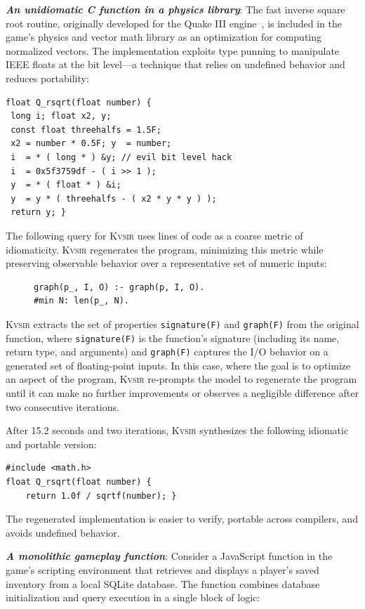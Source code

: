 \documentclass[sigplan,review,anonymous,10pt]{acmart}
\newcommand{\sys}{{\scshape Kv{\textalpha}sir}\xspace}
\newcommand{\heading}[1]{\vspace{2pt}\noindent\textbf{\emph{#1}}:\enspace}
\begin{document}
\heading{An unidiomatic C function in a physics library}
The fast inverse square root routine, originally developed for the Quake III
engine~\cite{fast_inv_sqrt}, is included in the game's physics and vector math
library as an optimization for computing normalized vectors.
The implementation
exploits type punning to manipulate IEEE floats at the bit level—a technique
that relies on undefined behavior and reduces portability:
\begin{verbatim}
float Q_rsqrt(float number) {
 long i; float x2, y;
 const float threehalfs = 1.5F;
 x2 = number * 0.5F; y  = number;
 i  = * ( long * ) &y; // evil bit level hack
 i  = 0x5f3759df - ( i >> 1 );
 y  = * ( float * ) &i;
 y  = y * ( threehalfs - ( x2 * y * y ) );
 return y; }
\end{verbatim}
The following query for \sys uses lines of code as a coarse metric of
idiomaticity. \sys regenerates the program, minimizing this metric while
preserving observable behavior over a representative set of numeric inputs:
\begin{figure}
  \vspace{-5pt}
  \begin{verbatim}
graph(p_, I, O) :- graph(p, I, O).
#min N: len(p_, N).
  \end{verbatim}
\end{figure}
\sys extracts the set of properties \texttt{signature(F)} and \texttt{graph(F)}
from the original function, where \texttt{signature(F)} is the function's
signature (including its name, return type, and arguments) and
\texttt{graph(F)} captures the I/O behavior on a generated set of
floating-point inputs.
In this case, where the goal is to optimize an aspect of the program, \sys
re-prompts the model to regenerate the program until it can make no further
improvements or observes a negligible difference after two consecutive
iterations.

After 15.2 seconds and two iterations, \sys synthesizes the following idiomatic and portable version:
\begin{verbatim}
#include <math.h>
float Q_rsqrt(float number) {
    return 1.0f / sqrtf(number); }
\end{verbatim}
The regenerated implementation is easier to verify, portable across compilers, and avoids undefined behavior.

\heading{A monolithic gameplay function}
Consider a JavaScript function in the game's scripting environment that
retrieves and displays a player's saved inventory from a local SQLite database.
The function combines database initialization and query execution in a single
block of logic:
\end{document}
